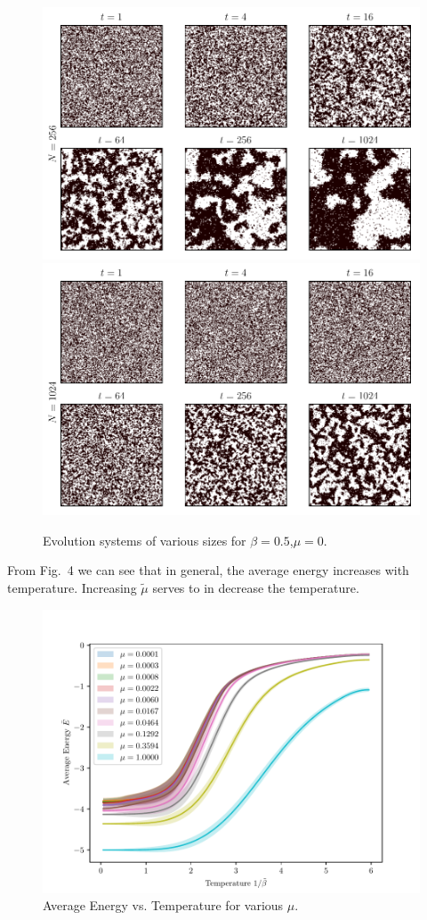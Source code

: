 \documentclass{llncs}
\begin{document}
\begin{figure}[h!]
\includegraphics[scale=0.25]{images/image256_0_0.pdf}
\includegraphics[scale=0.25]{images/image1024_0_0.pdf}
\caption{Evolution systems of various sizes for $\beta=0.5$,$\mu=0$.}
\end{figure}

From Fig.~4 we can see that in general, the average energy increases with temperature. Increasing $\tilde\mu$ serves to in decrease the temperature. 

\begin{figure}[h!]
	\centering
	\includegraphics[scale=0.75]{images/energy.pdf}
	\caption{Average Energy vs. Temperature for various $\mu$.}
\end{figure}
\end{document}

